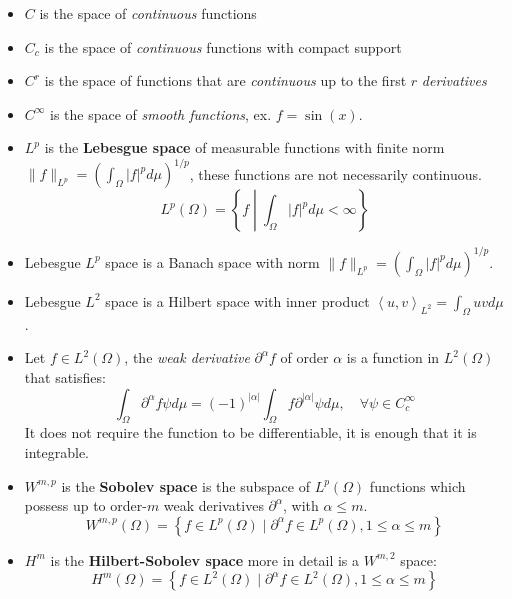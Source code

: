 \documentclass{digitaldynamics}
\begin{document}
\begin{itemize}
\begin{itemize}
		\item $C$ is the space of \textit{continuous} functions
		
		\item $C_c$ is the space of \textit{continuous} functions with compact support
		
		\item $C^r$ is the space of functions that are \textit{continuous} up to the first $r$ \textit{derivatives}
		
		\item $C^\infty$ is the space of \textit{smooth functions}, ex. $f=\sin(x)$.
		
		\item $L^p$ is the \textbf{Lebesgue space} of measurable functions with finite norm $\| f \|_{L^p}=\left( \int_\Omega |f|^p d\mu \right)^{1/p}$, these functions are not necessarily continuous.
		\[
		L^p(\Omega) = \left\{ f \; \left| \; \int_\Omega |f|^p d\mu < \infty \right. \right\}
		\]
		
		\item Lebesgue $L^p$ space is a Banach space with norm 
		$\| f \|_{L^p}=\left( \int_\Omega |f|^p d\mu \right)^{1/p}$.
		
		\item Lebesgue $L^2$ space is a Hilbert space with inner product 
		$\left\langle u , v \right\rangle_{L^2} = \int_\Omega u v d\mu$.
		
		\item Let $f \in L^2(\Omega)$, the \textit{weak derivative} $\partial^\alpha f$ of order $\alpha$ is a function in $L^2(\Omega)$ that satisfies:
		\[
		\int_\Omega \partial^\alpha f \psi d\mu =  (-1)^{|\alpha|} \int_\Omega f \partial^{|\alpha|} \psi d\mu, \quad \forall \psi 
		\in C^{\infty}_c
		\]
		It does not require the function to be differentiable, it is enough that it is integrable.
		
		\item  $W^{m,p}$ is the \textbf{Sobolev space} is the subspace of $L^p(\Omega)$ functions which possess up to order-$m$ weak derivatives $\partial^\alpha$, with $\alpha \leq m$.
		\[
		W^{m,p}(\Omega) = \left\{ f \in L^p(\Omega) \; | \; \partial^\alpha f \in L^p(\Omega), 1\leq  \alpha \leq m \right\}
		\]
		
		\item  $H^m$ is the \textbf{Hilbert-Sobolev space} more in detail is a $W^{m,2}$ space:
		\[
		H^m(\Omega) = \left\{ f \in L^2(\Omega) \; | \; \partial^\alpha f \in L^2(\Omega), 1\leq  \alpha \leq m \right\}
		\]
		

\end{itemize}
\end{itemize}
\end{document}
